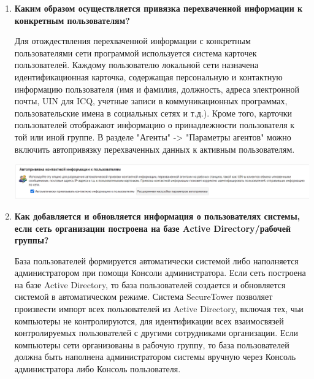 \documentclass[a4paper,14pt]{extarticle}
\begin{document}
\begin{enumerate}
\begin{center}
        \end{center}
        \item \textbf{Каким образом осуществляется привязка перехваченной информации к конкретным пользователям?}\par
        \qquad Для отождествления перехваченной информации с конкретным пользователями сети программой используется система карточек пользователей. Каждому пользователю локальной сети назначена идентификационная карточка, содержащая персональную и контактную информацию пользователя (имя и фамилия, должность, адреса электронной почты, UIN для ICQ, учетные записи в коммуникационных программах, пользовательские имена в социальных сетях и т.д.). Кроме того, карточки пользователей отображают информацию о принадлежности пользователя к той или иной группе. 
        В разделе "Агенты" -> "Параметры агентов" можно включить автопривязку перехваченных данных к активным пользователям.
        \begin{center}
            \includegraphics[scale=0.3]{pics/auto_connect.png}
        \end{center}
        \item \textbf{Как добавляется и обновляется информация о пользователях системы, если сеть организации построена на базе Active Directory/рабочей группы?}\par
        \qquad База пользователей формируется автоматически системой либо наполняется администратором при помощи Консоли администратора. Если сеть построена на базе Active Directory, то база пользователей создается и обновляется системой в автоматическом режиме. Система SecureTower позволяет произвести импорт всех пользователей из Active Directory, включая тех, чьи компьютеры не контролируются, для идентификации всех взаимосвязей контролируемых пользователей с другими сотрудниками организации. Если компьютеры сети организованы в рабочую группу, то база пользователей должна быть наполнена администратором системы вручную через Консоль администратора либо Консоль пользователя.

    \end{enumerate}
    
\end{document}
